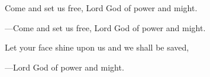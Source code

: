 \responsory

\begin{hangpar}


\medskip Come and set us free, Lord God of power and might.

{\color{red}---\thinspace }Come and set us free, Lord God of power and might.

\medskip Let your face shine upon us and we shall be saved,

{\color{red}---\thinspace }Lord God of power and might.
\end{hangpar}